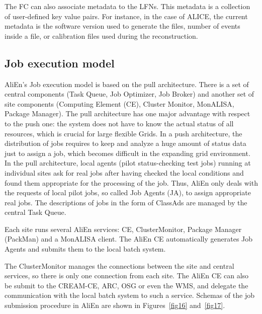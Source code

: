 The FC can also associate metadata to the LFNs. This metadata is a collection of
user-defined key value pairs. For instance, in the case of ALICE, the current metadata is 
the software version used to generate the files, number of events inside a file, or 
calibration files used during the reconstruction.


\subsection{Job execution model}
%
AliEn's Job execution model is based on the pull
architecture. There  is a set of central components (Task Queue, Job
Optimizer, Job Broker) and another set of  site components (Computing Element (CE),
Cluster Monitor, MonALISA, Package Manager). The pull architecture
has one major advantage with respect to the push one: the system does not have to
know the actual status of all resources, which is crucial for large
flexible Grids. In a push architecture, the distribution of jobs requires to 
keep and analyze a huge amount of status data just to assign a job,
which becomes difficult in the expanding grid environment. In the
pull architecture, local agents (pilot status-checking test jobs)
running at individual sites ask for real jobs after having checked
the local conditions and found them
appropriate for the processing of the job. Thus, AliEn only deals
with the requests of local pilot jobs, so called Job Agents (JA), to
assign appropriate real jobs. The descriptions of jobs in the form
of ClassAds are managed by the central Task Queue.

Each site runs several AliEn services: CE, ClusterMonitor,
Package Manager (PackMan) and a MonALISA client. The AliEn CE
automatically generates Job Agents and submits them to the local batch system. 

The ClusterMonitor manages the connections between
the site and central services, so there is only one connection from
each site. The AliEn CE can also be submit to the CREAM-CE, ARC, OSG  or even the WMS, 
and delegate the communication with the local batch system to such a service.
 Schemas of the job submission procedure in
AliEn are shown in Figures~\ref{fig16} and~\ref{fig17}.

